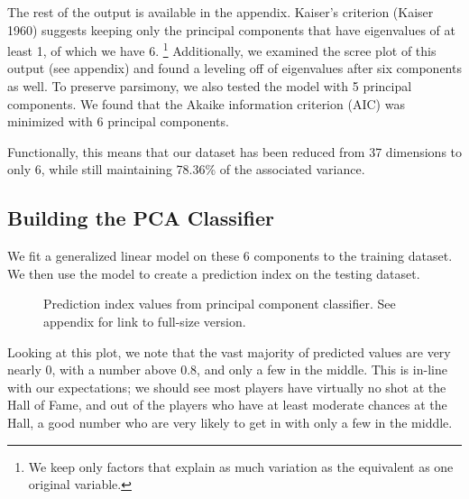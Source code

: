 \documentclass[letterpaper, 10 pt, conference]{ieeeconf}
\begin{document}
The rest of the output is available in the appendix. Kaiser's criterion (Kaiser 1960) suggests keeping only the principal components that have eigenvalues of at least 1, of which we have 6. \footnote{We keep only factors that explain as much variation as the equivalent as one original variable.} Additionally, we examined the scree plot of this output (see appendix) and found a leveling off of eigenvalues after six components as well. To preserve parsimony, we also tested the model with 5 principal components. We found that the Akaike information criterion (AIC) was minimized with 6 principal components.

Functionally, this means that our dataset has been reduced from 37 dimensions to only 6, while still maintaining 78.36\% of the associated variance.
\subsection{Building the PCA Classifier}
We fit a generalized linear model on these 6 components to the training dataset. We then use the model to create a prediction index on the testing dataset.

\begin{figure}[thpb]
\centering
{}
\caption{Prediction index values from principal component classifier. See appendix for link to full-size version.}
\label{figurelabel}
\end{figure}

Looking at this plot, we note that the vast majority of predicted values are very nearly 0, with a number above 0.8, and only a few in the middle. This is in-line with our expectations; we should see most players have virtually no shot at the Hall of Fame, and out of the players who have at least moderate chances at the Hall, a good number who are very likely to get in with only a few in the middle. 
\end{document}
